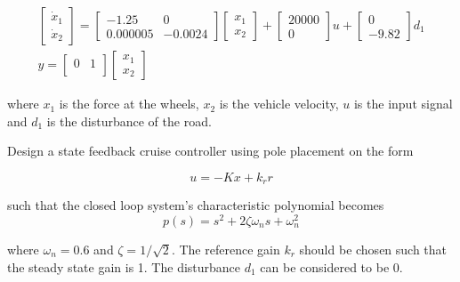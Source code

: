 \begin{eqnarray}
\begin{bmatrix}
 \dot{x}_1\\
 \dot{x}_2
\end{bmatrix}= 
\begin{bmatrix}
 -1.25 & 0 \\
 0.000005 & -0.0024 
\end{bmatrix}
\begin{bmatrix}
 x_1\\
 x_2
\end{bmatrix} +  
\begin{bmatrix}
 20000\\
 0
\end{bmatrix}u +
\begin{bmatrix}
 0\\
 -9.82
\end{bmatrix}d_1 \\
y=
\begin{bmatrix}
 0 & 1  \\
\end{bmatrix}
\begin{bmatrix}
 x_1\\
 x_2
\end{bmatrix} 
\end{eqnarray}

where $x_1$ is the force at the wheels, $x_2$ is the vehicle velocity, $u$ is the input signal and $d_1$ is the disturbance of the road.

Design a state feedback cruise controller using pole placement on the form

\begin{equation}
u = - K x + k_r r
\end{equation}

such that the closed loop system's characteristic polynomial becomes 
\begin{equation}
p(s) = s^2 + 2\zeta \omega_n s +\omega_{n}^{2}  
\end{equation}

where $\omega_n=0.6$ and $\zeta = 1/\sqrt{2}$. The reference gain $k_r$ should be chosen such that the steady state gain is 1. The disturbance $d_1$ can be considered to be 0.

